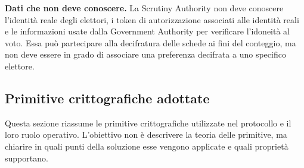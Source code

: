 \documentclass[a4paper,12pt]{article}
\begin{document}
\textbf{Dati che non deve conoscere.}
La Scrutiny Authority non deve conoscere l'identit\`a reale degli elettori, i token di autorizzazione associati alle identit\`a reali e le informazioni usate dalla Government Authority per verificare l'idoneit\`a al voto.
Essa pu\`o partecipare alla decifratura delle schede ai fini del conteggio, ma non deve essere in grado di associare una preferenza decifrata a uno specifico elettore.



\subsection{Primitive crittografiche adottate}

Questa sezione riassume le primitive crittografiche utilizzate nel protocollo e il loro ruolo operativo. 
L'obiettivo non \`e descrivere la teoria delle primitive, ma chiarire in quali punti della soluzione esse vengono applicate e quali propriet\`a supportano.
\end{document}
